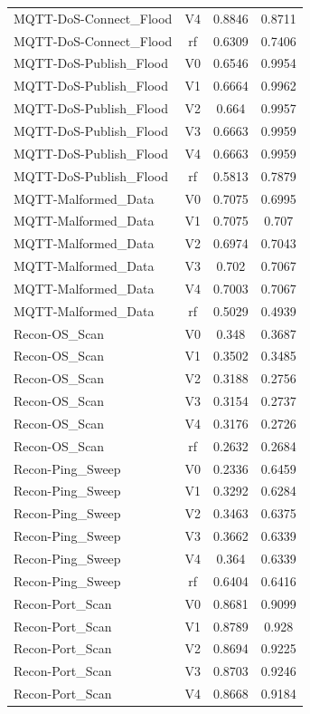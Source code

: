 \begin{table}[htbp]
\begin{tabular}{lccc}
MQTT-DoS-Connect\_Flood & V4 & 0.8846 & 0.8711 \\
MQTT-DoS-Connect\_Flood & rf & 0.6309 & 0.7406 \\
MQTT-DoS-Publish\_Flood & V0 & 0.6546 & 0.9954 \\
MQTT-DoS-Publish\_Flood & V1 & 0.6664 & 0.9962 \\
MQTT-DoS-Publish\_Flood & V2 & 0.664 & 0.9957 \\
MQTT-DoS-Publish\_Flood & V3 & 0.6663 & 0.9959 \\
MQTT-DoS-Publish\_Flood & V4 & 0.6663 & 0.9959 \\
MQTT-DoS-Publish\_Flood & rf & 0.5813 & 0.7879 \\
MQTT-Malformed\_Data & V0 & 0.7075 & 0.6995 \\
MQTT-Malformed\_Data & V1 & 0.7075 & 0.707 \\
MQTT-Malformed\_Data & V2 & 0.6974 & 0.7043 \\
MQTT-Malformed\_Data & V3 & 0.702 & 0.7067 \\
MQTT-Malformed\_Data & V4 & 0.7003 & 0.7067 \\
MQTT-Malformed\_Data & rf & 0.5029 & 0.4939 \\
Recon-OS\_Scan & V0 & 0.348 & 0.3687 \\
Recon-OS\_Scan & V1 & 0.3502 & 0.3485 \\
Recon-OS\_Scan & V2 & 0.3188 & 0.2756 \\
Recon-OS\_Scan & V3 & 0.3154 & 0.2737 \\
Recon-OS\_Scan & V4 & 0.3176 & 0.2726 \\
Recon-OS\_Scan & rf & 0.2632 & 0.2684 \\
Recon-Ping\_Sweep & V0 & 0.2336 & 0.6459 \\
Recon-Ping\_Sweep & V1 & 0.3292 & 0.6284 \\
Recon-Ping\_Sweep & V2 & 0.3463 & 0.6375 \\
Recon-Ping\_Sweep & V3 & 0.3662 & 0.6339 \\
Recon-Ping\_Sweep & V4 & 0.364 & 0.6339 \\
Recon-Ping\_Sweep & rf & 0.6404 & 0.6416 \\
Recon-Port\_Scan & V0 & 0.8681 & 0.9099 \\
Recon-Port\_Scan & V1 & 0.8789 & 0.928 \\
Recon-Port\_Scan & V2 & 0.8694 & 0.9225 \\
Recon-Port\_Scan & V3 & 0.8703 & 0.9246 \\
Recon-Port\_Scan & V4 & 0.8668 & 0.9184 \\

\end{tabular}
\end{table}
